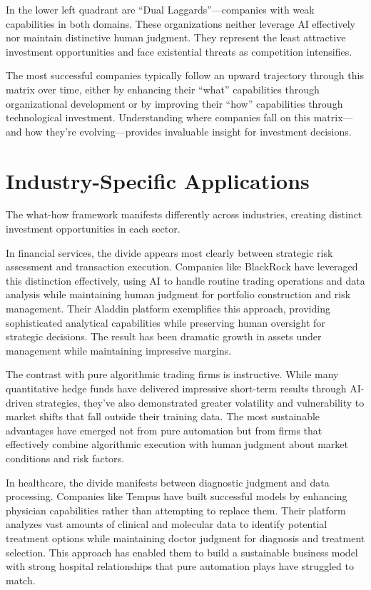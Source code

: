 \documentclass[
  Letterpaper,
]{scrbook}
\begin{document}
In the lower left quadrant are ``Dual Laggards''---companies with weak
capabilities in both domains. These organizations neither leverage AI
effectively nor maintain distinctive human judgment. They represent the
least attractive investment opportunities and face existential threats
as competition intensifies.

The most successful companies typically follow an upward trajectory
through this matrix over time, either by enhancing their ``what''
capabilities through organizational development or by improving their
``how'' capabilities through technological investment. Understanding
where companies fall on this matrix---and how they're
evolving---provides invaluable insight for investment decisions.

\section{Industry-Specific
Applications}\label{industry-specific-applications}

The what-how framework manifests differently across industries, creating
distinct investment opportunities in each sector.

In financial services, the divide appears most clearly between strategic
risk assessment and transaction execution. Companies like BlackRock have
leveraged this distinction effectively, using AI to handle routine
trading operations and data analysis while maintaining human judgment
for portfolio construction and risk management. Their Aladdin platform
exemplifies this approach, providing sophisticated analytical
capabilities while preserving human oversight for strategic decisions.
The result has been dramatic growth in assets under management while
maintaining impressive margins.

The contrast with pure algorithmic trading firms is instructive. While
many quantitative hedge funds have delivered impressive short-term
results through AI-driven strategies, they've also demonstrated greater
volatility and vulnerability to market shifts that fall outside their
training data. The most sustainable advantages have emerged not from
pure automation but from firms that effectively combine algorithmic
execution with human judgment about market conditions and risk factors.

In healthcare, the divide manifests between diagnostic judgment and data
processing. Companies like Tempus have built successful models by
enhancing physician capabilities rather than attempting to replace them.
Their platform analyzes vast amounts of clinical and molecular data to
identify potential treatment options while maintaining doctor judgment
for diagnosis and treatment selection. This approach has enabled them to
build a sustainable business model with strong hospital relationships
that pure automation plays have struggled to match.
\end{document}
